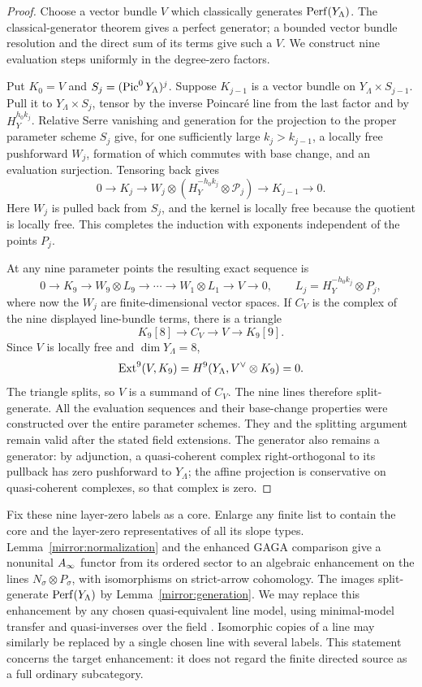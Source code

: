 \begin{proof}
Choose a vector bundle $V$ which classically generates
$\operatorname{Perf}(Y_\Lambda)$.  The classical-generator theorem
\cite{bondal-vdb} gives a perfect generator; a bounded vector bundle
resolution and the direct sum of its terms give such a $V$.
We construct nine evaluation steps uniformly in the degree-zero
factors.

Put $K_0=V$ and $S_j=(\operatorname{Pic}^0Y_\Lambda)^j$.  Suppose $K_{j-1}$ is
a vector bundle on $Y_\Lambda\times S_{j-1}$.  Pull it to
$Y_\Lambda\times S_j$, tensor by the inverse Poincar\'e line from
the last factor and by $H_Y^{h_0k_j}$.  Relative Serre vanishing and
generation for the projection to the proper parameter scheme $S_j$
give, for one sufficiently large $k_j>k_{j-1}$, a locally free
pushforward $W_j$, formation of which commutes with base change,
and an evaluation surjection.  Tensoring back gives
\[
 0\longrightarrow K_j\longrightarrow
 W_j\otimes(H_Y^{-h_0k_j}\otimes\mathcal P_j)
 \longrightarrow K_{j-1}\longrightarrow0.
\]
Here $W_j$ is pulled back from $S_j$, and the kernel is locally free
because the quotient is locally free.  This completes the induction
with exponents independent of the points $P_j$.

At any nine parameter points the resulting exact sequence is
\[
 0\to K_9\to W_9\otimes L_9\to\cdots\to
 W_1\otimes L_1\to V\to0,
 \qquad L_j=H_Y^{-h_0k_j}\otimes P_j,
\]
where now the $W_j$ are finite-dimensional vector spaces.  If $C_V$
is the complex of the nine displayed line-bundle terms, there is a
triangle
\[
 K_9[8]\longrightarrow C_V\longrightarrow V
       \longrightarrow K_9[9].
\]
Since $V$ is locally free and $\dim Y_\Lambda=8$,
\[
 \operatorname{Ext}^9(V,K_9)=H^9(Y_\Lambda,V^\vee\otimes K_9)=0.
\]
The triangle splits, so $V$ is a summand of $C_V$.  The nine lines
therefore split-generate.  All the evaluation sequences and their
base-change properties were constructed over the entire parameter
schemes.  They and the splitting argument remain valid after the
stated field extensions.  The generator also remains a generator:
by adjunction, a quasi-coherent complex right-orthogonal to its
pullback has zero pushforward to $Y_\Lambda$; the affine projection
is conservative on quasi-coherent complexes, so that complex is zero.
\end{proof}

Fix these nine layer-zero labels as a core.  Enlarge any finite list
to contain the core and the layer-zero representatives of all its
slope types.  Lemma~\ref{mirror:normalization} and the enhanced GAGA
comparison give a nonunital $A_\infty$ functor from its ordered sector
to an algebraic enhancement on the lines
$N_\sigma\otimes P_\sigma$, with isomorphisms on strict-arrow
cohomology.  The images split-generate $\operatorname{Perf}(Y_\Lambda)$ by
Lemma~\ref{mirror:generation}.  We may replace this enhancement by
any chosen quasi-equivalent line model, using minimal-model transfer
and quasi-inverses over the field \cite{seidel}.  Isomorphic copies
of a line may similarly be replaced by a single chosen line with
several labels.  This statement concerns the target enhancement:
it does not regard the finite directed source as a full ordinary
subcategory.

